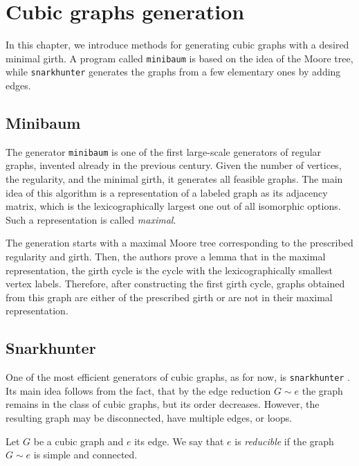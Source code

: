 \chapter{Cubic graphs generation}

In this chapter, we introduce methods for generating cubic graphs with a desired minimal girth. A program called \texttt{minibaum} \cite{minibaum} is based on the idea of the Moore tree, while \texttt{snarkhunter} \cite{snarkhunter, snarkhunter_better, snarkhunter_snarks} generates the graphs from a few elementary ones by adding edges. 

\section{Minibaum}
The generator \texttt{minibaum} \cite{minibaum} is one of the first large-scale generators of regular graphs, invented already in the previous century. Given the number of vertices, the regularity, and the minimal girth, it generates all feasible graphs. The main idea of this algorithm is a representation of a labeled graph as its adjacency matrix, which is the lexicographically largest one out of all isomorphic options. Such a representation is called \emph{maximal}.

The generation starts with a maximal Moore tree corresponding to the prescribed regularity and girth. Then, the authors prove a lemma \cite[p. 143]{minibaum} that in the maximal representation, the girth cycle is the cycle with the lexicographically smallest vertex labels. Therefore, after constructing the first girth cycle, graphs obtained from this graph are either of the prescribed girth or are not in their maximal representation.

\section{Snarkhunter}

One of the most efficient generators of cubic graphs, as for now, is \texttt{snarkhunter} \cite{snarkhunter, snarkhunter_better, snarkhunter_snarks}. Its main idea follows from the fact, that by the edge reduction $G\sim e$ the graph remains in the class of cubic graphs, but its order decreases. However, the resulting graph may be disconnected, have multiple edges, or loops.

\begin{definition}\cite[p. 70]{snarkhunter}
    Let $G$ be a cubic graph and $e$ its edge. We say that $e$ is \emph{reducible} if the graph $G\sim e$ is simple and connected.
\end{definition}

